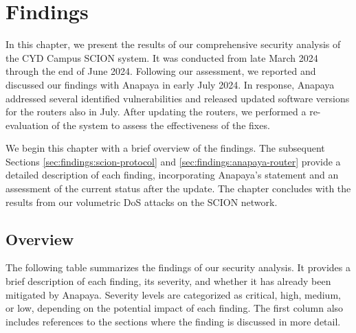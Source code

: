 \chapter{Findings}
\label{ch:findings}


In this chapter, we present the results of our comprehensive security analysis of the CYD Campus SCION system.
It was conducted from late March 2024 through the end of June 2024.
Following our assessment, we reported and discussed our findings with Anapaya in early July 2024.
In response, Anapaya addressed several identified vulnerabilities and released updated software versions for the routers also in July.
After updating the routers, we performed a re-evaluation of the system to assess the effectiveness of the fixes.

We begin this chapter with a brief overview of the findings.
The subsequent Sections \cref{sec:findings:scion-protocol} and \cref{sec:findings:anapaya-router} provide a detailed description of each finding, incorporating Anapaya's statement and an assessment of the current status after the update.
The chapter concludes with the results from our volumetric DoS attacks on the SCION network.

\section{Overview}
\label{sec:findings:overview}

The following table summarizes the findings of our security analysis.
It provides a brief description of each finding, its severity, and whether it has already been mitigated by Anapaya.
Severity levels are categorized as critical, high, medium, or low, depending on the potential impact of each finding.
The first column also includes references to the sections where the finding is discussed in more detail.


